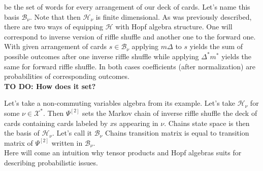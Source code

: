 \documentclass[a4paper, 12pt]{report}
\newcommand{\todo}[1]{\hfill \break \textbf{\Huge TO DO: #1 \hfill \break}\normalsize}
\begin{document}
be the set
of words for every arrangement of our deck of cards. Let's name this basis $\mathcal{B}_\nu$. Note that then
$\mathcal{H}_\nu$ is finite dimensional. As was previously described, there are two ways of equipping
$\mathcal{H}$ with Hopf algebra structure. One will correspond to inverse version of riffle shuffle and
another one to the forward one. With given arrangement of cards $s \in \mathcal{B}_\nu$ applying $m\Delta$ to
$s$ yields the sum of possible outcomes after one inverse riffle shuffle while applying $\Delta^*m^*$
yields the same for forward riffle shuffle. In both cases coefficients (after normalization) are
probabilities of corresponding outcomes. \\[4pt]

\todo{How does it set?}

Let's take a non-commuting variables algebra from its example. Let's take $\mathcal{H}_\nu$ for some
$\nu \in \mathcal{X}^*$. Then $\Psi^{[2]}$ sets the Markov chain of inverse riffle shuffle the deck of cards
containing cards labeled by $x$s appearing in $\nu$. Chains state space is then the basis of
$\mathcal{H}_\nu$. Let's call it $\mathcal{B}_\nu$
Chains transition matrix is equal to transition matrix of $\Psi^{[2]}$ written in $\mathcal{B}_\nu$.  \\

Here will come an intuition why tensor products and Hopf algebras suits for describing probabilistic issues.
\end{document}
